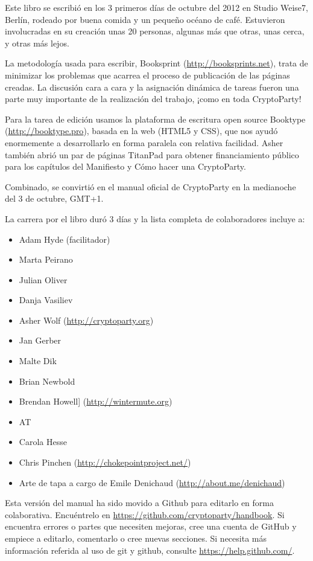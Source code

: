 \documentclass[10pt,a5paper,twoside,,]{book}
\providecommand{\tightlist}{%
  \setlength{\itemsep}{0pt}\setlength{\parskip}{0pt}}
\begin{document}
Este libro se escribió en los 3 primeros días de octubre del 2012 en
Studio Weise7, Berlín, rodeado por buena comida y un pequeño océano de
café. Estuvieron involucradas en su creación unas 20 personas, algunas
más que otras, unas cerca, y otras más lejos.

La metodología usada para escribir, Booksprint
(\url{http://booksprints.net}), trata de minimizar los problemas que
acarrea el proceso de publicación de las páginas creadas. La discusión
cara a cara y la asignación dinámica de tareas fueron una parte muy
importante de la realización del trabajo, ¡como en toda CryptoParty!

Para la tarea de edición usamos la plataforma de escritura open source
Booktype (\url{http://booktype.pro}), basada en la web (HTML5 y CSS),
que nos ayudó enormemente a desarrollarlo en forma paralela con relativa
facilidad. Asher también abrió un par de páginas TitanPad para obtener
financiamiento público para los capítulos del Manifiesto y Cómo hacer
una CryptoParty.

Combinado, se convirtió en el manual oficial de CryptoParty en la
medianoche del 3 de octubre, GMT+1.

La carrera por el libro duró 3 días y la lista completa de colaboradores
incluye a:

\begin{itemize}
\tightlist
\item
  Adam Hyde (facilitador)
\item
  Marta Peirano
\item
  Julian Oliver
\item
  Danja Vasiliev
\item
  Asher Wolf (\url{http://cryptoparty.org})
\item
  Jan Gerber
\item
  Malte Dik
\item
  Brian Newbold
\item
  Brendan Howell{]} (\url{http://wintermute.org})
\item
  AT
\item
  Carola Hesse
\item
  Chris Pinchen
  (\href{http://chokenpointproject.net}{http://chokepointproject.net/})
\item
  Arte de tapa a cargo de Emile Denichaud
  (\url{http://about.me/denichaud})
\end{itemize}

Esta versión del manual ha sido movido a Github para editarlo en forma
colaborativa. Encuéntrelo en
\url{https://github.com/cryptoparty/handbook}. Si encuentra errores o
partes que necesiten mejoras, cree una cuenta de GitHub y empiece a
editarlo, comentarlo o cree nuevas secciones. Si necesita más
información referida al uso de git y github, consulte
\url{https://help.github.com/}.
\end{document}
